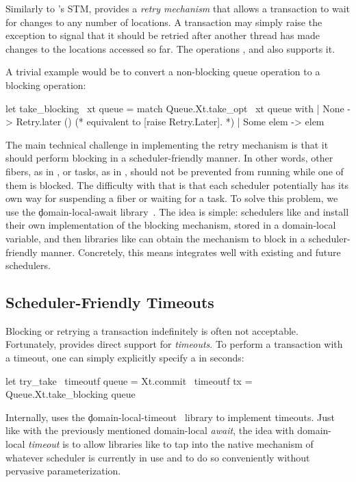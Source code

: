 Similarly to \Haskell's STM, \Kcas provides a \emph{retry mechanism} that allows a transaction to wait for changes to any number of locations.
A transaction may simply raise the exception  to signal that it should be retried after another thread has made changes to the locations accessed so far.
The operations ,  and  also supports it.

A trivial example would be to convert a non-blocking queue operation to a blocking operation:
\begin{ocamlcode}
let take_blocking ~xt queue =
  match Queue.Xt.take_opt ~xt queue with
  | None -> Retry.later () (* equivalent to [raise Retry.Later]. *)
  | Some elem -> elem
\end{ocamlcode}

The main technical challenge in implementing the retry mechanism is that it should perform blocking in a scheduler-friendly manner.
In other words, other fibers, as in \Eio, or tasks, as in \Domainslib, should not be prevented from running while one of them is blocked.
The difficulty with that is that each scheduler potentially has its own way for suspending a fiber or waiting for a task.
To solve this problem, we use the \c{domain-local-await} library~\citep{domain-local-await}.
The idea is simple: schedulers like \Eio and \Domainslib install their own implementation of the blocking mechanism, stored in a domain-local variable, and then libraries like \Kcas can obtain the mechanism to block in a scheduler-friendly manner.
Concretely, this means \Kcas integrates well with existing and future schedulers.

\subsection{Scheduler-Friendly Timeouts}
\label{sec:overview_timeouts}

Blocking or retrying a transaction indefinitely is often not acceptable.
Fortunately, \Kcas provides direct support for \emph{timeouts}.
To perform a transaction with a timeout, one can simply explicitly specify a  in seconds:
\begin{ocamlcode}
let try_take ~timeoutf queue =
  Xt.commit ~timeoutf { tx = Queue.Xt.take_blocking queue }
\end{ocamlcode}

Internally, \Kcas uses the \c{domain-local-timeout}~\citep{domain-local-timeout} library to implement timeouts.
Just like with the previously mentioned domain-local \emph{await}, the idea with domain-local \emph{timeout} is to allow libraries like \Kcas to tap into the native mechanism of whatever scheduler is currently in use and to do so conveniently without pervasive parameterization.

